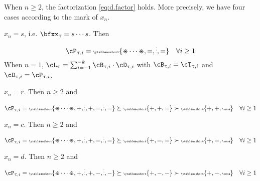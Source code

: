 \documentclass[12pt,a4paper]{amsart}
\makeatletter
\numberwithin{equation}{section}
\theoremstyle{remark}
\let\ytb=\ytableaushort
\newcommand{\tytb}[1]{{\tiny\ytb{#1}}}
\newcommand{\dotminus}{\mathbin{\text{\@dotminus}}}
\newcommand{\@dotminus}{%
  \ooalign{\hidewidth\raise1ex\hbox{.}\hidewidth\cr$\m@th-$\cr}%
}
\def\pcL{\cL^+}
\def\uptaupp{\uptau^{\prime\prime}}
\def\uum{{\dotminus}}
\def\uup{\divideontimes}
\makeatother
\begin{document}
\begin{enumT}
 When $n\geq 2$, the factorization \eqref{eq:d.factor} holds.
 More precisely, we have four cases according to the mark of $x_{n}$.
 \begin{enumT}
   \item $x_{n}=s$, i.e. $\bfxx_{\uptau} = s\cdots s$. Then
   \[
  \cP_{\uptau,i}  = \tytb{\uup\cdots\uup,=,\vdots,=} \quad \forall i \geq 1
   \]
   When $n= 1$,
   $\cL_{\uptau} = \sum_{i=-1}^{-k} \cB_{\uptau,i}\cdot \cD_{\uptau,i}$
   with $\cB_{\uptau,i} = \cT_{\uptau,i}$ and $\cD_{\uptau,i} = \cP_{\uptau,i}$.
   \item $x_{n}=r$. Then $n\geq 2$ and
   \[
  \cP_{\uptau,i}  = \tytb{\uup\cdots\uup,+,\vdots,+,=,\vdots,=} \succeq \tytb{+,+,=}\succ \tytb{+,+,\none}
  \quad \forall i\geq 1
  \]
   \item $x_{n}=c$. Then $n\geq 2$ and
   \[
  \cP_{\uptau,i}  = \tytb{\uup\cdots\uup,+,\vdots,+,=,\vdots,=} \succeq \tytb{+,=,=}\succ \tytb{+,=,\none}
  \quad \forall i\geq 1
   \]
   \item $x_{n}=d$. Then $n\geq 2$ and
   \[
  \cP_{\uptau,i}  = \tytb{\uup\cdots\uup,+,\vdots,+,-,\vdots,-}  \succeq \tytb{+,-,-}\succ \tytb{+,-,\none}
  \quad \forall i\geq 1
   \]
 \end{enumT}

  \end{enumT}
\end{document}
